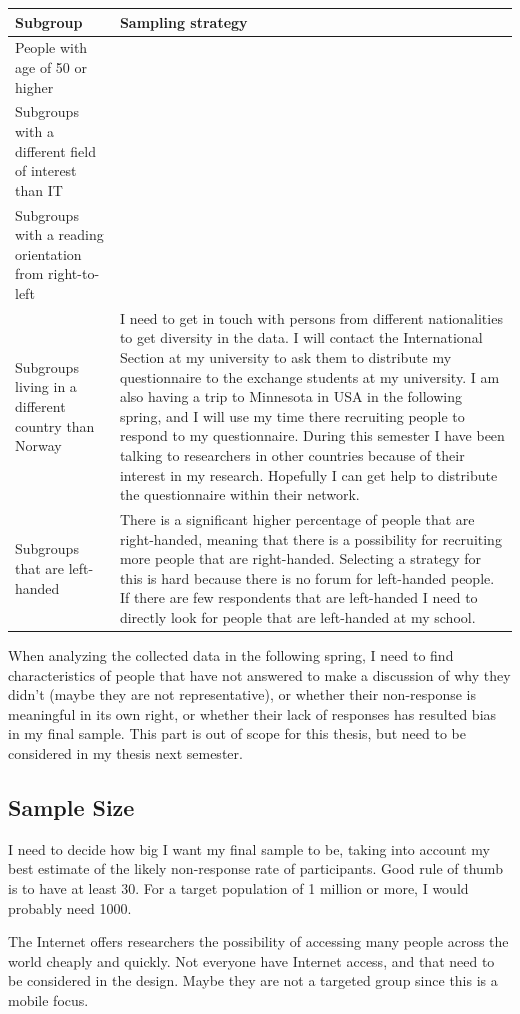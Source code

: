     \begin{tabular}{| p{4cm} | p{7cm} |}
      \hline
      {\bf Subgroup} & {\bf Sampling strategy} \\ \hline
      People with age of 50 or higher & \\ \hline
      Subgroups with a different field of interest than IT & \\ \hline
      Subgroups with a reading orientation from right-to-left & \\ \hline
      Subgroups living in a different country than Norway & I need to get in touch with persons from different nationalities to get diversity in the data. I will contact the International Section at my university to ask them to distribute my questionnaire to the exchange students at my university. I am also having a trip to Minnesota in USA in the following spring, and I will use my time there recruiting people to respond to my questionnaire. During this semester I have been talking to researchers in other countries because of their interest in my research. Hopefully I can get help to distribute the questionnaire within their network. \\ \hline
      Subgroups that are left-handed & There is a significant higher percentage of people that are right-handed, meaning that there is a possibility for recruiting more people that are right-handed. Selecting a strategy for this is hard because there is no forum for left-handed people. If there are few respondents that are left-handed I need to directly look for people that are left-handed at my school.\\ \hline
    \end{tabular}

    When analyzing the collected data in the following spring, I need to find characteristics of people that have not answered to make a discussion of why they didn't (maybe they are not representative), or whether their non-response is meaningful in its own right, or whether their lack of responses has resulted bias in my final sample. This part is out of scope for this thesis, but need to be considered in my thesis next semester.
  
  \subsection{Sample Size}
    I need to decide how big I want my final sample to be, taking into account my best estimate of the likely non-response rate of participants. 
    Good rule of thumb is to have at least 30. For a target population of 1 million or more, I would probably need 1000. 

    The Internet offers researchers the possibility of accessing many people across the world cheaply and quickly. Not everyone have Internet access, and that need to be considered in the design. Maybe they are not a targeted group since this is a mobile focus.

